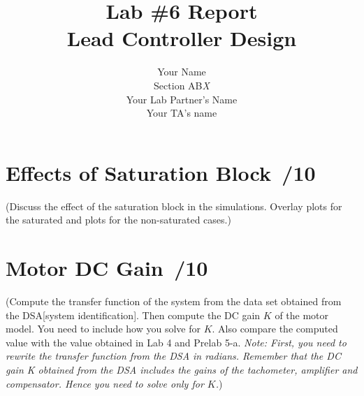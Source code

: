 \documentclass{article}
\newcommand{\score}{\hfill \underline{\hspace{0.65cm}}\,/} %
\begin{document}
\title{\bf Lab \#6 Report\\{\sc Lead Controller Design}}
\author{Your Name\\ Section AB\emph{X}\\
Your Lab Partner's Name\\
Your TA's name}
\maketitle

\noindent {}

\section{Effects of Saturation Block \score 10}
(Discuss the effect of the saturation block in the simulations. Overlay plots for the saturated and plots for the non-saturated cases.)




\section{Motor DC Gain \score 10}
(Compute the transfer function of the system from the data set obtained from the DSA[system identification]. Then compute the DC gain $K$ of the motor model. You need to include how you solve for $K$. Also compare the computed value with the value obtained in Lab 4 and Prelab 5-a. \emph{Note: First, you need to rewrite the transfer function from the DSA in radians. Remember that the DC gain K obtained from the DSA includes the gains of the tachometer, amplifier and compensator. Hence you need to solve only for $K$.})
\end{document}
